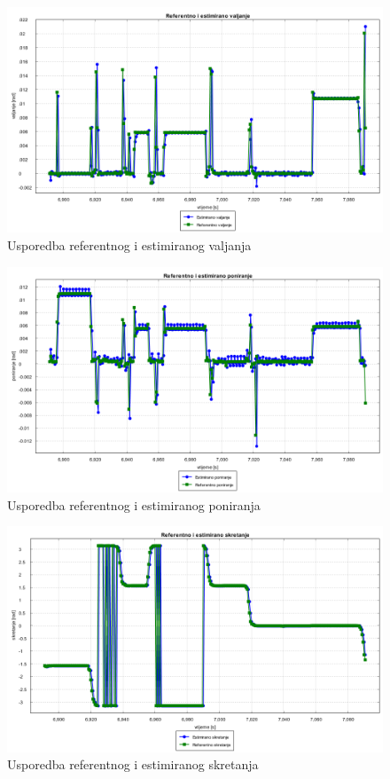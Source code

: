 \begin{figure}[H]
  \includegraphics[scale=0.4]{images/algo1/primjer3/referentno_estimirano_valjanje.png}
  \caption{Usporedba referentnog i estimiranog valjanja}
  \label{eval:a1p3_rot_roll}
\end{figure}
\begin{figure}[H]
  \includegraphics[scale=0.4]{images/algo1/primjer3/referentno_estimirano_poniranje.png}
  \caption{Usporedba referentnog i estimiranog poniranja}
  \label{eval:a1p3_rot_pitch}
\end{figure}
\begin{figure}[H]
  \includegraphics[scale=0.4]{images/algo1/primjer3/referentno_estimirano_skretanje.png}
  \caption{Usporedba referentnog i estimiranog skretanja}
  \label{eval:a1p3_rot_yaw}
\end{figure}


